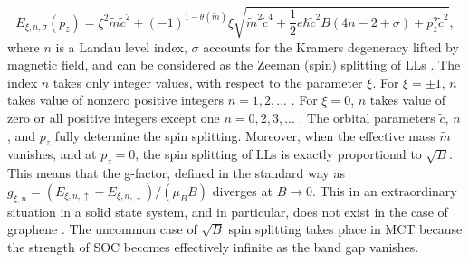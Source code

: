 \documentclass[titlepage,a4paper]{book}
\begin{document}
\begin{equation}
\label{Eq:MCT_LLs}
E_{\xi,n,\sigma }(p_z) = \xi^2 \tilde{m}\tilde{c}^2 + (-1)^{1-\theta (\tilde{m})} \xi \sqrt{\tilde{m}^2\tilde{c}^4 + \frac{1}{2}e\hbar\tilde{c}^2B (4n - 2 + \sigma) + p_z^2\tilde{c}^2},
\end{equation}
where $n$ is a Landau level index, $\sigma$ accounts for the Kramers degeneracy lifted by magnetic field, and can be considered as the Zeeman  (spin) splitting of LLs \cite{Teppe_MCT}. The index $n$ takes only integer values, with respect to the parameter $\xi$. For $\xi = \pm 1$, $n$ takes value of nonzero positive integers $n = 1,2,...$ . For $\xi = 0$, $n$ takes value of zero or all positive integers except one $n = 0,2,3,...$ . The orbital parameters $\tilde{c}$, $n$, and $p_z$ fully determine the spin splitting. Moreover, when the effective mass $\tilde{m}$ vanishes, and at $p_z = 0$, the spin splitting of LLs is exactly proportional to $\sqrt{B}$. This means that the g-factor, defined in the standard way as $g_{\xi , n} = (E_{\xi , n , \uparrow} - E_{\xi , n , \downarrow})/(\mu_B B)$ diverges at $B \rightarrow 0$. This in an extraordinary situation in a solid state system, and in particular, does not exist in the case of graphene \cite{Orlita_MCT}. The uncommon case of $\sqrt{B}$ spin splitting takes place in MCT because the strength of SOC becomes effectively infinite as the band gap vanishes. 
\end{document}
